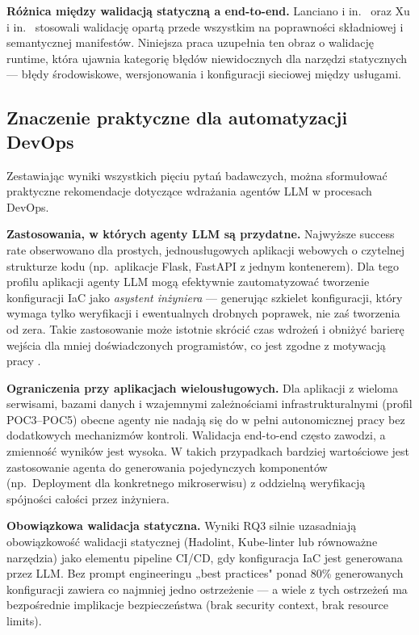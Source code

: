\textbf{Różnica między walidacją statyczną a end-to-end.} Lanciano i in.\ \cite{lanciano_analyzing_2023} oraz Xu i in.\ \cite{xu_cloudeval-yaml_2023} stosowali walidację opartą przede wszystkim na poprawności składniowej i semantycznej manifestów. Niniejsza praca uzupełnia ten obraz o walidację runtime, która ujawnia kategorię błędów niewidocznych dla narzędzi statycznych — błędy środowiskowe, wersjonowania i konfiguracji sieciowej między usługami.

\subsection{Znaczenie praktyczne dla automatyzacji DevOps}

Zestawiając wyniki wszystkich pięciu pytań badawczych, można sformułować praktyczne rekomendacje dotyczące wdrażania agentów LLM w procesach DevOps.

\textbf{Zastosowania, w których agenty LLM są przydatne.} Najwyższe success rate obserwowano dla prostych, jednousługowych aplikacji webowych o czytelnej strukturze kodu (np.\ aplikacje Flask, FastAPI z jednym kontenerem). Dla tego profilu aplikacji agenty LLM mogą efektywnie zautomatyzować tworzenie konfiguracji IaC jako \textit{asystent inżyniera} — generując szkielet konfiguracji, który wymaga tylko weryfikacji i ewentualnych drobnych poprawek, nie zaś tworzenia od zera. Takie zastosowanie może istotnie skrócić czas wdrożeń i obniżyć barierę wejścia dla mniej doświadczonych programistów, co jest zgodne z motywacją pracy \cite{hu_llm-based_2025}.

\textbf{Ograniczenia przy aplikacjach wielousługowych.} Dla aplikacji z wieloma serwisami, bazami danych i wzajemnymi zależnościami infrastrukturalnymi (profil POC3--POC5) obecne agenty nie nadają się do w pełni autonomicznej pracy bez dodatkowych mechanizmów kontroli. Walidacja end-to-end często zawodzi, a zmienność wyników jest wysoka. W takich przypadkach bardziej wartościowe jest zastosowanie agenta do generowania pojedynczych komponentów (np.\ Deployment dla konkretnego mikroserwisu) z oddzielną weryfikacją spójności całości przez inżyniera.

\textbf{Obowiązkowa walidacja statyczna.} Wyniki RQ3 silnie uzasadniają obowiązkowość walidacji statycznej (Hadolint, Kube-linter lub równoważne narzędzia) jako elementu pipeline CI/CD, gdy konfiguracja IaC jest generowana przez LLM. Bez prompt engineeringu „best practices" ponad 80\% generowanych konfiguracji zawiera co najmniej jedno ostrzeżenie — a wiele z tych ostrzeżeń ma bezpośrednie implikacje bezpieczeństwa (brak security context, brak resource limits).

